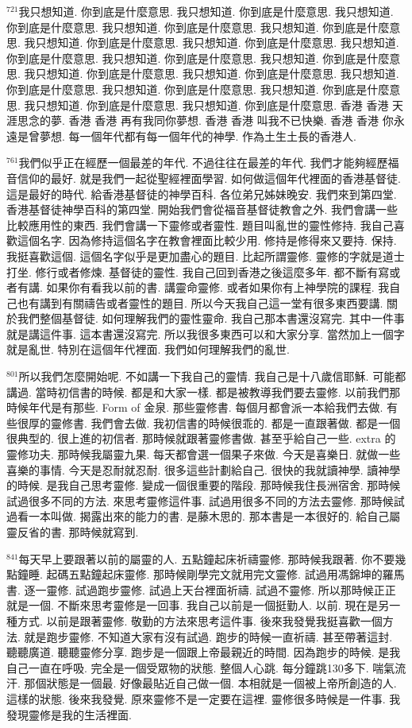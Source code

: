 \documentclass{book}
\begin{document}
$^{721}$我只想知道.
你到底是什麼意思.
我只想知道.
你到底是什麼意思.
我只想知道.
你到底是什麼意思.
我只想知道.
你到底是什麼意思.
我只想知道.
你到底是什麼意思.
我只想知道.
你到底是什麼意思.
我只想知道.
你到底是什麼意思.
我只想知道.
你到底是什麼意思.
我只想知道.
你到底是什麼意思.
我只想知道.
你到底是什麼意思.
我只想知道.
你到底是什麼意思.
我只想知道.
你到底是什麼意思.
我只想知道.
你到底是什麼意思.
我只想知道.
你到底是什麼意思.
我只想知道.
你到底是什麼意思.
我只想知道.
你到底是什麼意思.
我只想知道.
你到底是什麼意思.
香港 香港 天涯思念的夢.
香港 香港 再有我同你夢想.
香港 香港 叫我不已快樂.
香港 香港 你永遠是曾夢想.
每一個年代都有每一個年代的神學.
作為土生土長的香港人.

$^{761}$我們似乎正在經歷一個最差的年代.
不過往往在最差的年代.
我們才能夠經歷福音信仰的最好.
就是我們一起從聖經裡面學習.
如何做這個年代裡面的香港基督徒.
這是最好的時代.
給香港基督徒的神學百科.
各位弟兄姊妹晚安.
我們來到第四堂.
香港基督徒神學百科的第四堂.
開始我們會從福音基督徒教會之外.
我們會講一些比較應用性的東西.
我們會講一下靈修或者靈性.
題目叫亂世的靈性修持.
我自己喜歡這個名字.
因為修持這個名字在教會裡面比較少用.
修持是修得來又要持.
保持.
我挺喜歡這個.
這個名字似乎是更加盡心的題目.
比起所謂靈修.
靈修的字就是道士打坐.
修行或者修煉.
基督徒的靈性.
我自己回到香港之後這麼多年.
都不斷有寫或者有講.
如果你有看我以前的書.
講靈命靈修.
或者如果你有上神學院的課程.
我自己也有講到有關禱告或者靈性的題目.
所以今天我自己這一堂有很多東西要講.
關於我們整個基督徒.
如何理解我們的靈性靈命.
我自己那本書還沒寫完.
其中一件事就是講這件事.
這本書還沒寫完.
所以我很多東西可以和大家分享.
當然加上一個字就是亂世.
特別在這個年代裡面.
我們如何理解我們的亂世.

$^{801}$所以我們怎麼開始呢.
不如講一下我自己的靈情.
我自己是十八歲信耶穌.
可能都講過.
當時初信書的時候.
都是和大家一樣.
都是被教導我們要去靈修.
以前我們那時候年代是有那些.
Form of 金泉.
那些靈修書.
每個月都會派一本給我們去做.
有些很厚的靈修書.
我們會去做.
我初信書的時候很乖的.
都是一直跟著做.
都是一個很典型的.
很上進的初信者.
那時候就跟著靈修書做.
甚至乎給自己一些.
extra 的靈修功夫.
那時候我屬靈九果.
每天都會選一個果子來做.
今天是喜樂日.
就做一些喜樂的事情.
今天是忍耐就忍耐.
很多這些計劃給自己.
很快的我就讀神學.
讀神學的時候.
是我自己思考靈修.
變成一個很重要的階段.
那時候我住長洲宿舍.
那時候試過很多不同的方法.
來思考靈修這件事.
試過用很多不同的方法去靈修.
那時候試過看一本叫做.
揭露出來的能力的書.
是藤木思的.
那本書是一本很好的.
給自己屬靈反省的書.
那時候就寫到.

$^{841}$每天早上要跟著以前的屬靈的人.
五點鐘起床祈禱靈修.
那時候我跟著.
你不要幾點鐘睡.
起碼五點鐘起床靈修.
那時候剛學完文就用完文靈修.
試過用馮錦坤的羅馬書.
逐一靈修.
試過跑步靈修.
試過上天台裡面祈禱.
試過不靈修.
所以那時候正正就是一個.
不斷來思考靈修是一回事.
我自己以前是一個挺勤人.
以前.
現在是另一種方式.
以前是跟著靈修.
敬勤的方法來思考這件事.
後來我發覺我挺喜歡一個方法.
就是跑步靈修.
不知道大家有沒有試過.
跑步的時候一直祈禱.
甚至帶著這封.
聽聽廣道.
聽聽靈修分享.
跑步是一個跟上帝最親近的時間.
因為跑步的時候.
是我自己一直在呼吸.
完全是一個受眾物的狀態.
整個人心跳.
每分鐘跳130多下.
喘氣流汗.
那個狀態是一個最.
好像最貼近自己做一個.
本相就是一個被上帝所創造的人.
這樣的狀態.
後來我發覺.
原來靈修不是一定要在這裡.
靈修很多時候是一件事.
我發現靈修是我的生活裡面.
\end{document}
